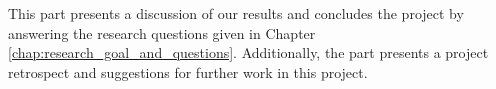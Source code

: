 This part presents a discussion of our results and concludes the project by answering the research questions given in Chapter \ref{chap:research_goal_and_questions}. Additionally, the part presents a project retrospect and suggestions for further work in this project. 







